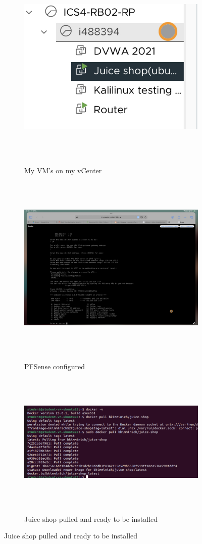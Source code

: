 \documentclass[12pt, letterpaper]{article}
\begin{document}
\begin{figure}[!ht]
    \centering
    \begin{subfigure}{.5\textwidth}
        \centering
        \includegraphics[width=.8\linewidth]{fotos/Bok week 1/Week_1_install_vmware.jpeg}
        \caption{My VM's on my vCenter}
    \end{subfigure}%
    \begin{subfigure}{.5\textwidth}
        \centering
        \includegraphics[width=.8\linewidth]{fotos/Bok week 1/Pfsense_install.jpeg}
        \caption{PFSense configured}
    \end{subfigure}
    \begin{subfigure}{.5\textwidth}
    \centering
    \includegraphics[width=.8\linewidth]{fotos/Bok week 1/Juice shop installed.jpeg}
    \caption{Juice shop pulled and ready to be installed}
    \label{fig:sub3}
\end{subfigure}%
\end{figure}\mbox{}\\
\end{document}
